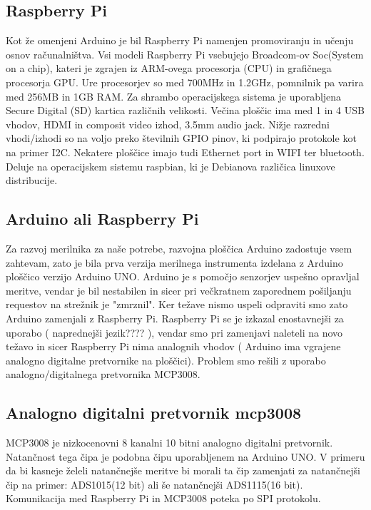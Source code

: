 \documentclass[12pt,a4paper,titlepage,openany]{report}
\begin{document}
\subsection{Raspberry Pi}
Kot že omenjeni Arduino je bil Raspberry Pi namenjen promoviranju in učenju osnov računalništva. Vsi modeli Raspberry Pi vsebujejo Broadcom-ov Soc(System on a chip), kateri je zgrajen iz ARM-ovega procesorja (CPU) in grafičnega procesorja GPU. Ure procesorjev so med 700MHz in 1.2GHz, pomnilnik pa varira med 256MB in 1GB RAM. Za shrambo operacijskega sistema je uporabljena Secure Digital (SD) kartica različnih velikosti. Večina ploščic ima med 1 in 4 USB vhodov, HDMI in composit video izhod, 3.5mm audio jack. Nižje razredni vhodi/izhodi so na voljo preko številnih GPIO pinov, ki podpirajo protokole kot na primer I2C. Nekatere ploščice imajo tudi Ethernet port in WIFI ter bluetooth. Deluje na operacijskem sistemu raspbian, ki je Debianova različica linuxove distribucije.

\subsection{Arduino ali Raspberry Pi}
Za razvoj merilnika za naše potrebe, razvojna ploščica Arduino zadostuje vsem zahtevam, zato je bila prva verzija merilnega instrumenta izdelana z Arduino ploščico verzijo Arduino UNO. Arduino je s pomočjo senzorjev uspešno opravljal meritve, vendar je bil nestabilen in sicer pri večkratnem zaporednem pošiljanju requestov na strežnik  je "zmrznil". Ker težave nismo uspeli odpraviti smo zato Arduino zamenjali z Raspberry Pi. Raspberry Pi se je izkazal enostavnejši za uporabo ( naprednejši jezik???? ), vendar smo pri zamenjavi naleteli na novo težavo in sicer Raspberry Pi nima analognih vhodov ( Arduino ima vgrajene analogno digitalne pretvornike na ploščici). Problem smo rešili z uporabo analogno/digitalnega pretvornika MCP3008.

\subsection{Analogno digitalni pretvornik mcp3008}
MCP3008 je nizkocenovni 8 kanalni 10 bitni analogno digitalni pretvornik. Natančnost tega čipa je podobna čipu uporabljenem na Arduino UNO. V primeru da bi kasneje želeli natančnejše meritve bi morali ta čip zamenjati za natančnejši čip na primer: ADS1015(12 bit) ali še natančnejši ADS1115(16 bit). Komunikacija med Raspberry Pi in MCP3008 poteka po SPI protokolu.
\end{document}
